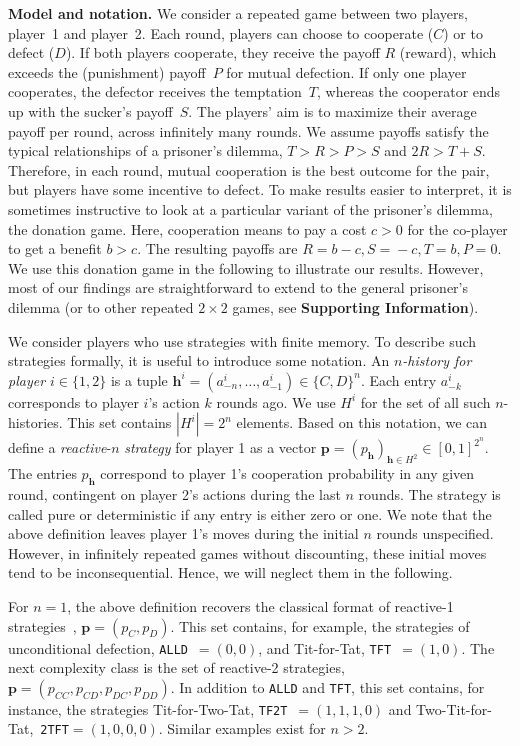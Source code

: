 \documentclass[11pt]{article}
\def\tft{\texttt{TFT}}
\def\tftt{\texttt{TF2T}}
\def\ttft{\texttt{2TFT}}
\def\alld{\texttt{ALLD}}
\def\SI{\textbf{Supporting Information}}
\begin{document}
\textbf{Model and notation.}
We consider a repeated game between two players, player~1 and player~2.
Each round, players can choose to cooperate ($C$) or to defect ($D$). 
If both players cooperate, they receive the payoff $R$ (reward), which exceeds the (punishment) payoff~$P$ for mutual defection. 
If only one player cooperates, the defector receives the temptation~$T$, whereas the cooperator ends up with the sucker's payoff~$S$. 
The players' aim is to maximize their average payoff per round, across infinitely many rounds.
We assume payoffs satisfy the typical relationships of a prisoner's dilemma, $T \!>\! R \!>\! P \!>\! S$ and $2 R \!>\! T \!+\! S$. 
Therefore, in each round, mutual cooperation is the best outcome for the pair, but players have some incentive to defect. 
To make results easier to interpret, it is sometimes instructive to look at a particular variant of the prisoner's dilemma, the donation game. 
Here, cooperation means to pay a cost $c\!>\!0$ for the co-player to get a benefit $b\!>\!c$.
The resulting payoffs are \(R \!\!=\! b\! -\! c, S \!=\! -c, T \!=\! b, P\!
=\! 0\). 
We use this donation game in the following to illustrate our results. 
However, most of our findings are straightforward to extend to the general prisoner's dilemma (or to other repeated $2\!\times\!2$ games, see \SI). 

We consider players who use strategies with finite memory. 
To describe such strategies formally, it is useful to introduce some notation. 
An {\it $n$-history for player $i\! \in\! \{1, 2\}$} is a tuple $\mathbf{h}^i\!=\!(a^i_{-n},\ldots,a^i_{-1})\!\in\!\{C,D\}^n$. 
Each entry $a^i_{-k}$ corresponds to player $i$'s action $k$ rounds ago. 
We use $H^i$ for the set of all such $n$-histories. 
This set contains $|H^i|\!=\!2^{n}$ elements. 
Based on this notation, we can define a {\it reactive}-$n$ {\it strategy} for player 1 as a vector $\mathbf{p}\!=\!(p_\mathbf{h})_{\mathbf{h}\in H^2} \!\in\! [0, 1]^{2^n}$. 
The entries $p_\mathbf{h}$ correspond to player 1's cooperation probability in any given round, contingent on player 2's actions during the last $n$ rounds. 
The strategy is called pure or deterministic if any entry is either zero or one. 
We note that the above definition leaves player 1's moves during the initial $n$ rounds unspecified. 
However, in infinitely repeated games without discounting, these initial moves tend to be inconsequential. 
Hence, we will neglect them in the following.

For \(n\!=\!1\), the above definition recovers the classical format of reactive-1 strategies~\cite{sigmund2010}, \(\mathbf{p}\!=\!(p_C, p_D)\). 
This set contains, for example, the strategies of unconditional defection, \alld~$=\!(0,0)$, and Tit-for-Tat, \tft~$=\!(1,0)$. 
The next complexity class is the set of reactive-2 strategies, $\mathbf{p}\!=\!(p_{CC},p_{CD},p_{DC},p_{DD})$.
In addition to \alld{} and \tft{}, this set contains, for instance, the strategies Tit-for-Two-Tat, \tftt~$=\!(1,1,1,0)$ and Two-Tit-for-Tat,~\ttft$=\!(1,0,0,0)$. 
Similar examples exist for $n\!>\!2$. 
\end{document}
